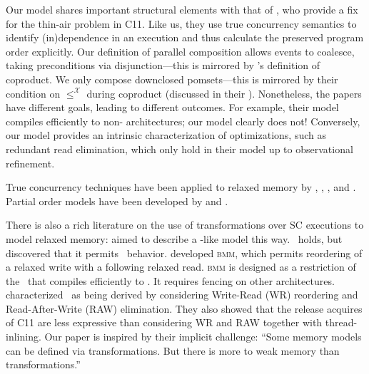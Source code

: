Our model shares important structural elements with that of
\citet{DBLP:conf/esop/PaviottiCPWOB20}, who provide a fix for the thin-air
problem in C11.  Like us, they use true concurrency semantics to identify
(in)dependence in an execution and thus calculate the preserved program order
explicitly.  Our definition of parallel composition allows events to
coalesce, taking preconditions via disjunction---this is mirrored by
\citeauthor{DBLP:conf/esop/PaviottiCPWOB20}'s definition of coproduct.  We
only compose downclosed pomsets---this is mirrored by their condition on
$\leq^{\mathcal{X}}$ during coproduct (discussed in their ).
Nonetheless, the papers have different goals, leading to different outcomes.
For example, their model compiles efficiently to non-\mca{} architectures; our
model clearly does not!  Conversely, our model provides an intrinsic
characterization of optimizations, such as redundant read elimination, which
only hold in their model up to observational refinement.




True concurrency techniques have been applied to relaxed memory by
\citet{DBLP:conf/esop/CenciarelliKS07}, \citet{Castellan},
\citet{Pichon-Pharabod:2016:CSR:2837614.2837616}, and
\citet{DBLP:conf/cgo/ChakrabortyV17}.
Partial order models have been developed by \citet{brookes} and
\citet{DBLP:journals/lmcs/KavanaghB19}.

There is also a rich literature on the use of transformations over SC
executions to model relaxed memory:
%
\citet{Saraswat:2007:TMM:1229428.1229469}
aimed to describe a \jmm-like model this way.  \drfsc\ holds, but \citet{SP} 
discovered that it permits \oota\ behavior.
%
\citet{DBLP:conf/popl/DemangeLZJPV13} developed \textsc{bmm}, which permits
reordering of a relaxed write with a following relaxed read.
\textsc{bmm} is designed as a restriction of the \jmm\ that compiles efficiently to
\tso.  It requires fencing on other architectures.
%
\citet{DBLP:conf/fm/LahavV16} characterized \tso\ as being derived by
considering Write-Read (\textsf{WR}) reordering and Read-After-Write
(\textsf{RAW}) elimination.  They also showed that the release acquires of
C11 are less expressive than considering \textsf{WR} and \textsf{RAW}
together with thread-inlining.  Our paper is inspired by their implicit
challenge: ``Some memory models can be defined via transformations.  But
there is more to weak memory than transformations.''

